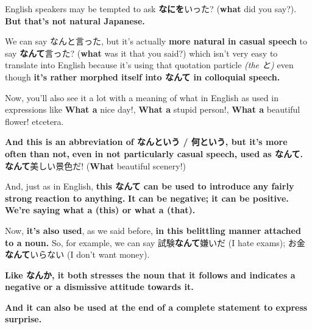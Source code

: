 English speakers may be tempted to ask {\bf なにを}いった? ({\bf what} did you say?). {\bf But that's not natural Japanese.}

We can say なんと言った, but it's actually {\bf more natural in casual speech} to say {\bf なんて}言った? ({\bf what} was it that you said?) which isn't very easy to translate into English because it's using that quotation particle {\em (the と)} even though {\bf it's rather morphed itself into なんて in colloquial speech.}

\startsectionlevel[title={なんて as What a (this) or What a (that)},reference={なんて-as-what-a-this-or-what-a-that}]

Now, you'll also see it a lot with a meaning of what in English as used in expressions like {\bf What a} nice day!, {\bf What a} stupid person!, {\bf What a} beautiful flower! etcetera.

{}

{\bf And this is an abbreviation of なんという / 何という, but it's more often than not,} {\bf even in not particularly casual speech, used as なんて.} {\bf なんて}美しい景色だ! ({\bf What} beautiful scenery!)

And, just as in English, {\bf this なんて can be used to introduce} {\bf any fairly strong reaction to anything.} {\bf It can be negative; it can be positive.} {\bf We're saying what a (this) or what a (that).}

\stopsectionlevel

\startsectionlevel[title={なんて used in a belittling manner},reference={なんて-used-in-a-belittling-manner}]

Now, {\bf it's also used}, as we said before, {\bf in this belittling manner attached to a noun.} So, for example, we can say 試験{\bf なんて}嫌いだ (I hate exams); お金{\bf なんて}いらない (I don't want money).

{}

{\bf Like なんか, it both stresses the noun that it follows} {\bf and indicates a negative or a dismissive attitude towards it.}

\stopsectionlevel

\startsectionlevel[title={なんて used to express surprise},reference={なんて-used-to-express-surprise}]

{\bf And it can also be used at the end of a complete statement to express surprise.}

{}

